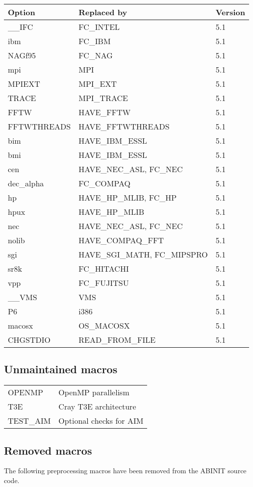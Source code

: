 \begin{center}
\begin{tabular}{|l|l|l|}
\hline 
\textbf{Option}  & \textbf{Replaced by}  & \textbf{Version} \tabularnewline
\hline 
\_\_IFC  & FC\_INTEL  & 5.1 \tabularnewline
ibm  & FC\_IBM  & 5.1 \tabularnewline
NAGf95  & FC\_NAG  & 5.1 \tabularnewline
\hline 
mpi  & MPI  & 5.1 \tabularnewline
MPIEXT  & MPI\_EXT  & 5.1 \tabularnewline
TRACE  & MPI\_TRACE  & 5.1 \tabularnewline
\hline 
FFTW  & HAVE\_FFTW  & 5.1 \tabularnewline
FFTWTHREADS  & HAVE\_FFTWTHREADS  & 5.1 \tabularnewline
\hline 
bim  & HAVE\_IBM\_ESSL  & 5.1 \tabularnewline
bmi  & HAVE\_IBM\_ESSL  & 5.1 \tabularnewline
cen  & HAVE\_NEC\_ASL, FC\_NEC  & 5.1 \tabularnewline
dec\_alpha  & FC\_COMPAQ  & 5.1 \tabularnewline
hp  & HAVE\_HP\_MLIB, FC\_HP  & 5.1 \tabularnewline
hpux  & HAVE\_HP\_MLIB  & 5.1 \tabularnewline
nec  & HAVE\_NEC\_ASL, FC\_NEC  & 5.1 \tabularnewline
nolib  & HAVE\_COMPAQ\_FFT  & 5.1 \tabularnewline
sgi  & HAVE\_SGI\_MATH, FC\_MIPSPRO  & 5.1 \tabularnewline
sr8k  & FC\_HITACHI  & 5.1 \tabularnewline
vpp  & FC\_FUJITSU  & 5.1 \tabularnewline
\hline 
\_\_VMS  & VMS  & 5.1 \tabularnewline
P6  & i386  & 5.1 \tabularnewline
macosx  & OS\_MACOSX  & 5.1 \tabularnewline
\hline 
CHGSTDIO  & READ\_FROM\_FILE  & 5.1 \tabularnewline
\hline
\end{tabular}
\par\end{center}


\subsection{Unmaintained macros}

\begin{center}
\begin{tabular}{ll}
OPENMP  & OpenMP parallelism \tabularnewline
T3E  & Cray T3E architecture \tabularnewline
TEST\_AIM  & Optional checks for AIM \tabularnewline
\end{tabular}
\par\end{center}


\subsection{Removed macros}

The following preprocessing macros have been removed from the ABINIT
source code.

